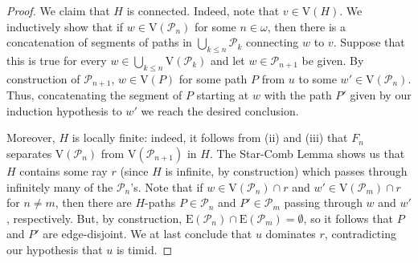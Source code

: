 \documentclass[10pt]{article}
\numberwithin{equation}{subsection}
\theoremstyle{remark}
\begin{document}
\begin{proof}
    We claim that $H$ is connected. Indeed, note that $v\in \mathrm{V}(H)$. We inductively show that if $w\in \mathrm{V}(\mathcal P_n)$ for some $n\in\omega$, then there is a concatenation of segments of paths in $\bigcup_{k\le n}\mathcal{P}_k$ connecting $w$ to $v$. Suppose that this is true for every $w\in \bigcup_{k\le n} \mathrm{V}(\mathcal P_k)$ and let $w\in \mathcal P_{n+1}$ be given. By construction of $\mathcal{P}_{n+1}$, $w\in \mathrm{V}(P)$ for some path $P$ from $u$ to some $w'\in \mathrm{V}(\mathcal P_n)$. Thus, concatenating the segment of $P$ starting at $w$ with the path $P'$ given by our induction hypothesis to $w'$ we reach the desired conclusion. 
    
    Moreover, $H$ is locally finite: indeed, it follows from (ii) and (iii) that $F_n$ separates $\mathrm{V}(\mathcal P_n)$ from $\mathrm{V}(\mathcal P_{n+1})$ in $H$. The Star-Comb Lemma shows us that $H$ contains some ray $r$ (since $H$ is infinite, by construction) which passes through infinitely many of the $\mathcal P_n$'s. Note that if $w\in \mathrm{V}(\mathcal P_n)\cap r$ and $w'\in \mathrm{V}(\mathcal P_m)\cap r$ for $n\neq m$, then there are $H$-paths $P\in \mathcal P_n$ and $P'\in \mathcal P_m$ passing through $w$ and $w'$, respectively. But, by construction, $\mathrm{E}(\mathcal P_n)\cap \mathrm{E}(\mathcal P_m)=\emptyset$, so it follows that $P$ and $P'$ are edge-disjoint. We at last conclude that $u$ dominates $r$, contradicting our hypothesis that $u$ is timid. 
\end{proof}
\end{document}
